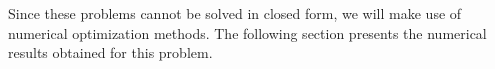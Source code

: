 \documentclass[review]{elsarticle}
\begin{document}
Since these problems cannot be solved in closed form, we will make use
of numerical optimization methods. The following section presents the
numerical results obtained for this problem.


\end{document}
